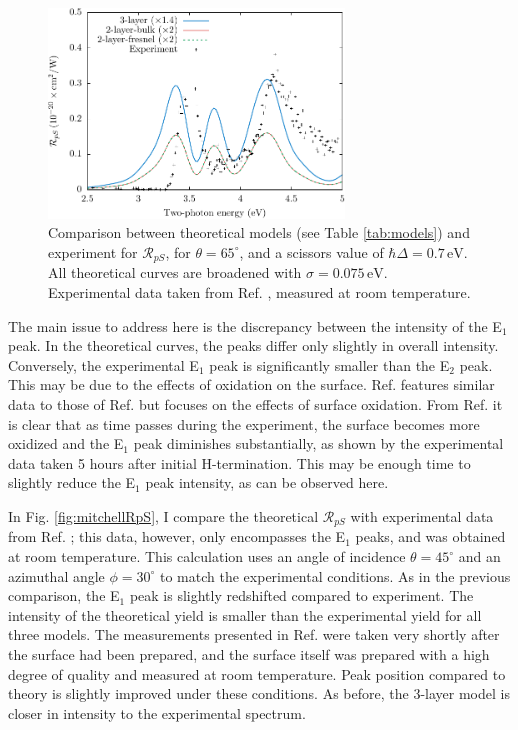 \begin{figure}
\centering
\includegraphics[width=0.7\textwidth]{figures/fig-4_4_01}
\caption{Comparison between theoretical models (see Table \ref{tab:models}) and
experiment for $\mathcal{R}_{pS}$, for $\theta=65^{\circ}$, and a scissors
value of $\hbar\Delta = 0.7\,\text{eV}$. All theoretical curves are broadened
with $\sigma=0.075\,\text{eV}$. Experimental data taken from Ref.
\cite{mejiaPRB02}, measured at room temperature.}
\label{fig:RpS}
\end{figure}

The main issue to address here is the discrepancy between the intensity of the
E$_{1}$ peak. In the theoretical curves, the peaks differ only slightly in
overall intensity. Conversely, the experimental E$_{1}$ peak is significantly
smaller than the E$_{2}$ peak. This may be due to the effects of oxidation on
the surface. Ref. \cite{bergfeldPRL04} features similar data to those of Ref.
\cite{mejiaPRB02} but focuses on the effects of surface oxidation. From Ref.
\cite{bergfeldPRL04} it is clear that as time passes during the experiment, the
surface becomes more oxidized and the E$_{1}$ peak diminishes substantially, as
shown by the experimental data taken 5 hours after initial H-termination. This
may be enough time to slightly reduce the E$_{1}$ peak intensity, as can be
observed here.

In Fig. \ref{fig:mitchellRpS}, I compare the theoretical $\mathcal{R}_{pS}$ with
experimental data from Ref. \cite{mitchellSS01}; this data, however, only
encompasses the E$_{1}$ peaks, and was obtained at room temperature. This
calculation uses an angle of incidence $\theta=45^\circ$ and an azimuthal angle
$\phi=30^\circ$ to match the experimental conditions. As in the previous
comparison, the E$_{1}$ peak is slightly redshifted compared to experiment. The
intensity of the theoretical yield is smaller than the experimental yield for
all three models. The measurements presented in Ref. \cite{mitchellSS01} were
taken very shortly after the surface had been prepared, and the surface itself
was prepared with a high degree of quality and measured at room temperature.
Peak position compared to theory is slightly improved under these conditions. As
before, the 3-layer model is closer in intensity to the experimental spectrum.


